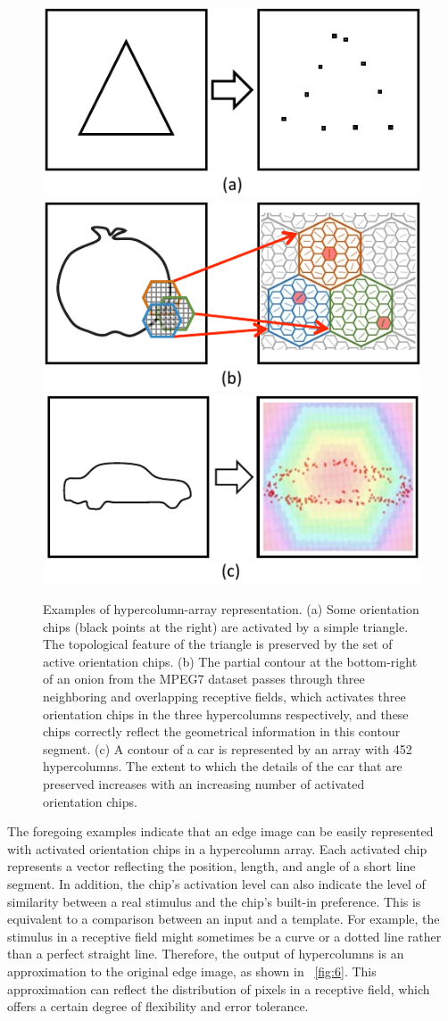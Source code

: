 \documentclass[journal]{IEEEtran}
\begin{document}
\begin{figure}[!t]
\centering
\includegraphics[width=0.25\linewidth]{images/fig3.pdf}\hfil%
\includegraphics[width=0.25\linewidth]{images/fig4.pdf}\hfil%
\includegraphics[width=0.25\linewidth]{images/fig5.pdf}
\caption{Examples of hypercolumn-array representation.
(a) Some orientation chips (black points at the right) are activated by a simple triangle.
The topological feature of the triangle is preserved by the set of active orientation chips.
(b) The partial contour at the bottom-right of an onion from the MPEG7 dataset 
passes through three neighboring and overlapping receptive fields, 
which activates three orientation chips in the three hypercolumns respectively, 
and these chips correctly reflect the geometrical information in this contour segment.
(c) A contour of a car is represented by an array with 452 hypercolumns. 
The extent to which the details of the car that are preserved increases 
with an increasing number of activated orientation chips.}
\label{fig:3to5}
\end{figure}

The foregoing examples indicate that an edge image can be easily represented with activated orientation chips in a hypercolumn array. 
Each activated chip represents a vector reflecting the position, length, and angle of a short line segment. 
In addition, the chip's activation level can also indicate the level of similarity between a real stimulus and the chip's built-in preference. 
This is equivalent to a comparison between an input and a template. 
For example, the stimulus in a receptive field might sometimes be a curve or a dotted line rather than a perfect straight line. 
Therefore, the output of hypercolumns is an approximation to the original edge image, 
as shown in \figurename~\ref{fig:6}. 
This approximation can reflect the distribution of pixels in a receptive field, which offers a certain degree of flexibility and error tolerance.
\end{document}
